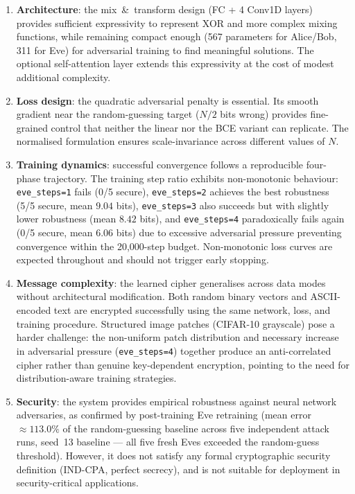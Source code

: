 \documentclass[12pt, a4paper]{article}
\newcommand{\code}[1]{\texttt{\color{CodeRed}#1}}
\begin{document}
\begin{enumerate}[leftmargin=2em, itemsep=5pt]

  \item \textbf{Architecture}: the mix~\&~transform design (FC + 4
        Conv1D layers) provides sufficient expressivity to represent
        XOR and more complex mixing functions, while remaining compact
        enough (567 parameters for Alice/Bob, 311 for Eve) for adversarial
        training to find meaningful solutions. The optional self-attention
        layer extends this expressivity at the cost of modest additional
        complexity.

  \item \textbf{Loss design}: the quadratic adversarial penalty is
        essential. Its smooth gradient near the random-guessing target
        ($N/2$ bits wrong) provides fine-grained control that neither
        the linear nor the BCE variant can replicate. The normalised
        formulation ensures scale-invariance across different values
        of $N$.

  \item \textbf{Training dynamics}: successful convergence follows a
        reproducible four-phase trajectory. The training step ratio exhibits
        non-monotonic behaviour: \code{eve\_steps=1} fails (0/5 secure),
        \code{eve\_steps=2} achieves the best robustness (5/5 secure,
        mean $9.04$ bits), \code{eve\_steps=3} also succeeds but with
        slightly lower robustness (mean $8.42$ bits), and
        \code{eve\_steps=4} paradoxically fails again (0/5 secure,
        mean $6.06$ bits) due to excessive adversarial pressure preventing
        convergence within the 20{,}000-step budget. Non-monotonic
        loss curves are expected throughout and should not trigger
        early stopping.

  \item \textbf{Message complexity}: the learned cipher generalises
        across data modes without architectural modification. Both random
        binary vectors and ASCII-encoded text are encrypted successfully
        using the same network, loss, and training procedure. Structured
        image patches (CIFAR-10 grayscale) pose a harder challenge:
        the non-uniform patch distribution and necessary increase in
        adversarial pressure (\code{eve\_steps=4}) together produce an
        anti-correlated cipher rather than genuine key-dependent encryption,
        pointing to the need for distribution-aware training strategies.

  \item \textbf{Security}: the system provides empirical robustness
        against neural network adversaries, as confirmed by
        post-training Eve retraining (mean error $\approx 113.0\%$ of
        the random-guessing baseline across five independent attack
        runs, seed~13 baseline --- all five fresh Eves exceeded the
        random-guess threshold). However, it does not satisfy any formal cryptographic
        security definition (IND-CPA, perfect secrecy), and is not
        suitable for deployment in security-critical applications.

\end{enumerate}
\end{document}
